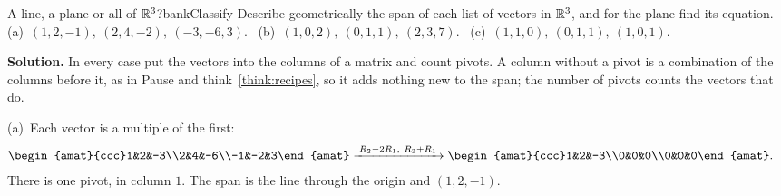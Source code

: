\documentclass[11pt]{article}
\begin{document}
\begin{exmp}{A line, a plane or all of $\mathbb{R}^3$?}{bankClassify}
Describe geometrically the span of each list of vectors in $\mathbb{R}^3$, and for the plane find its equation. (a)~$(1,2,-1),\ (2,4,-2),\ (-3,-6,3)$. \ (b)~$(1,0,2),\ (0,1,1),\ (2,3,7)$. \ (c)~$(1,1,0),\ (0,1,1),\ (1,0,1)$.

\textbf{Solution.} In every case put the vectors into the columns of a matrix and count pivots. A column without a pivot is a combination of the columns before it, as in Pause and think~\ref{think:recipes}, so it adds nothing new to the span; the number of pivots counts the vectors that do.

(a)~Each vector is a multiple of the first:
\begin{align*}
\begin{amat}{ccc}1&2&-3\\2&4&-6\\-1&-2&3\end{amat}
&\rops{R_2-2R_1,\ R_3+R_1}
\begin{amat}{ccc}1&2&-3\\0&0&0\\0&0&0\end{amat}.
\end{align*}
There is one pivot, in column $1$. The span is the line through the origin and $(1,2,-1)$.


\end{exmp}
\end{document}
